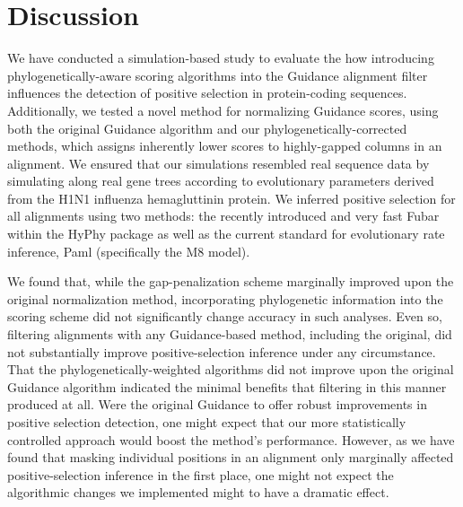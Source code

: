 \documentclass[10pt]{article}
\begin{document}










\section*{Discussion}

We have conducted a simulation-based study to evaluate the how introducing phylogenetically-aware scoring algorithms into the Guidance alignment filter influences the detection of positive selection in protein-coding sequences. Additionally, we tested a novel method for normalizing Guidance scores, using both the original Guidance algorithm and our phylogenetically-corrected methods, which assigns inherently lower scores to highly-gapped columns in an alignment. We ensured that our simulations resembled real sequence data by simulating along real gene trees according to evolutionary parameters derived from the H1N1 influenza hemagluttinin protein. We inferred positive selection for all alignments using two methods: the recently introduced and very fast Fubar \citep{Murrell2013} within the HyPhy package \citep{Pond2005} as well as the current standard for evolutionary rate inference, Paml \citep{Yang2007} (specifically the M8 model).

We found that, while the gap-penalization scheme marginally improved upon the original normalization method, incorporating phylogenetic information into the scoring scheme did not significantly change accuracy in such analyses. Even so, filtering alignments with any Guidance-based method, including the original, did not substantially improve positive-selection inference under any circumstance. That the phylogenetically-weighted algorithms did not improve upon the original Guidance algorithm indicated the minimal benefits that filtering in this manner produced at all. Were the original Guidance to offer robust improvements in positive selection detection, one might expect that our more statistically controlled approach would boost the method's performance. However, as we have found that masking individual positions in an alignment only marginally affected positive-selection inference in the first place, one might not expect the algorithmic changes we implemented might to have a dramatic effect.
\end{document}
